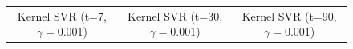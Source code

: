 \documentclass{article}
\begin{document}
\begin{figure}[h]
\begin{tabular}{ccc}
        \small Kernel SVR (t=7, $\gamma=0.001$) & \small Kernel SVR (t=30, $\gamma=0.001$) & \small Kernel SVR (t=90, $\gamma=0.001$) \\
    \end{tabular}
\end{figure}
\end{document}
